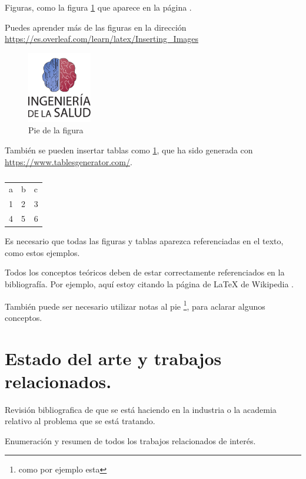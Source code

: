 Figuras, como la figura \ref{fig:escudo} que aparece en la página \pageref{fig:escudo}. 

Puedes aprender más de las figuras en la dirección \url{https://es.overleaf.com/learn/latex/Inserting_Images}

\begin{figure}[h]
    \centering
    \includegraphics[width=0.25\textwidth]{img/escudoSalud.pdf}
    \caption{Pie de la figura}
    \label{fig:escudo}
\end{figure}


También se pueden insertar tablas como \ref{tab:my-table}, que ha sido generada con \url{https://www.tablesgenerator.com/}.

\begin{table}[]
\begin{tabular}{lll}
a & b & c \\
1 & 2 & 3 \\
4 & 5 & 6
\end{tabular}
\caption{}
\label{tab:my-table}
\end{table}

Es necesario que todas las figuras y tablas aparezca referenciadas en el texto, como estos ejemplos.

Todos los conceptos teóricos deben de estar correctamente referenciados en la bibliografía. Por ejemplo, aquí estoy citando la página de \LaTeX{} de Wikipedia \cite{wiki:latex}.

También puede ser necesario utilizar notas al pie \footnote{como por ejemplo esta}, para aclarar algunos conceptos.


\section{Estado del arte y trabajos relacionados.}

Revisión bibliografica de que se está haciendo en la industria o la academia relativo al problema que se está tratando.

Enumeración y resumen de todos los trabajos relacionados de interés.

